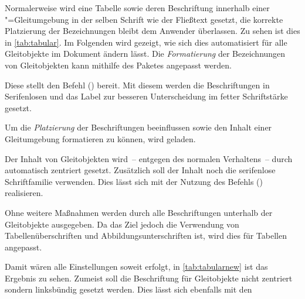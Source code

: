 \documentclass[%
  english,ngerman,%
  cdgeometry=no,DIV=12,automark,%
]{tudscrartcl}
\begin{document}
Normalerweise wird eine Tabelle sowie deren Beschriftung innerhalb einer 
"=Gleitumgebung in der selben Schrift wie der Fließtext 
gesetzt, die korrekte Platzierung der Bezeichnungen bleibt dem Anwender 
überlassen. Zu sehen ist dies in \autoref{tab:tabular}. Im Folgenden wird 
gezeigt, wie sich dies automatisiert für alle Gleitobjekte im Dokument ändern 
lässt. Die \emph{Formatierung} der Bezeichnungen von Gleitobjekten kann 
mithilfe des Paketes  angepasst werden.
%
\begin{Preamble}
\usepackage{caption}
\end{Preamble}
%
Diese stellt den Befehl () bereit. Mit 
diesem werden die Beschriftungen in Serifenlosen und das Label zur besseren 
Unterscheidung im fetter Schriftstärke gesetzt.
%
\begin{Preamble*}
\captionsetup{font=sf,labelfont=bf,labelsep=space}
\end{Preamble*}
%
Um die \emph{Platzierung} der Beschriftungen beeinflussen sowie den Inhalt 
einer Gleitumgebung formatieren zu können, wird  geladen. 
\begin{Preamble}
\usepackage{floatrow}
\end{Preamble}
%
Der Inhalt von Gleitobjekten wird~-- entgegen des normalen Verhaltens~-- durch 
 automatisch zentriert gesetzt. Zusätzlich soll der Inhalt 
noch die serifenlose Schriftfamilie verwenden. Dies lässt sich mit der Nutzung 
des Befehls () realisieren.
%
\begin{Preamble*}
\end{Preamble*}
%
Ohne weitere Maßnahmen werden durch  alle Beschriftungen 
unterhalb der Gleitobjekte ausgegeben. Da das Ziel jedoch die Verwendung von 
Tabellenüberschriften und Abbildungsunterschriften ist, wird dies für Tabellen
angepasst.
%
\begin{Preamble*}
\end{Preamble*}
%
\begin{table}
\end{table}%
%
Damit wären alle Einstellungen soweit erfolgt, in \autoref{tab:tabularnew} ist 
das Ergebnis zu sehen. Zumeist soll die Beschriftung für Gleitobjekte nicht 
zentriert sondern linksbündig gesetzt werden. Dies lässt sich ebenfalls mit den 
\end{document}
